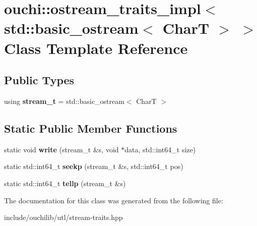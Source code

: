 \hypertarget{classouchi_1_1ostream__traits__impl_3_01std_1_1basic__ostream_3_01_char_t_01_4_01_4}{}\section{ouchi\+::ostream\+\_\+traits\+\_\+impl$<$ std\+::basic\+\_\+ostream$<$ CharT $>$ $>$ Class Template Reference}
\label{classouchi_1_1ostream__traits__impl_3_01std_1_1basic__ostream_3_01_char_t_01_4_01_4}
\subsection*{Public Types}
\begin{DoxyCompactItemize}
\item 
\mbox{\label{classouchi_1_1ostream__traits__impl_3_01std_1_1basic__ostream_3_01_char_t_01_4_01_4_a6c19f6d3675ab5beebac9b96c86e691a}} 
using {\bfseries stream\+\_\+t} = std\+::basic\+\_\+ostream$<$ CharT $>$
\end{DoxyCompactItemize}
\subsection*{Static Public Member Functions}
\begin{DoxyCompactItemize}
\item 
\mbox{\label{classouchi_1_1ostream__traits__impl_3_01std_1_1basic__ostream_3_01_char_t_01_4_01_4_af206681853b3be309a4bbe88955fe680}} 
static void {\bfseries write} (stream\+\_\+t \&s, void $\ast$data, std\+::int64\+\_\+t size)
\item 
\mbox{\label{classouchi_1_1ostream__traits__impl_3_01std_1_1basic__ostream_3_01_char_t_01_4_01_4_a1bb58841a08b8e75e86655ae98048c33}} 
static std\+::int64\+\_\+t {\bfseries seekp} (stream\+\_\+t \&s, std\+::int64\+\_\+t pos)
\item 
\mbox{\label{classouchi_1_1ostream__traits__impl_3_01std_1_1basic__ostream_3_01_char_t_01_4_01_4_ac94b592131984d45d7ba46629005804b}} 
static std\+::int64\+\_\+t {\bfseries tellp} (stream\+\_\+t \&s)
\end{DoxyCompactItemize}


The documentation for this class was generated from the following file\+:\begin{DoxyCompactItemize}
\item 
include/ouchilib/utl/stream-\/traits.\+hpp\end{DoxyCompactItemize}
